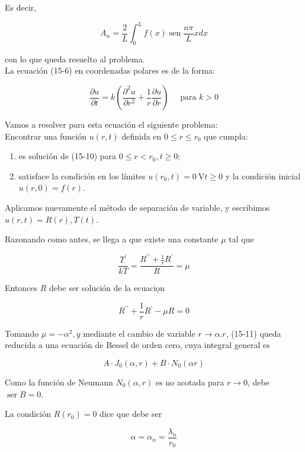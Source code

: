 \documentclass[10pt]{article}
\theoremstyle{plain}
\theoremstyle{definition}
\theoremstyle{remark}
\begin{document}
Es decir,

$$
A_{n}=\frac{2}{L} \int_{0}^{L} f(x) \operatorname{sen} \frac{n \pi}{L} x d x
$$

con lo que queda resuelto al problema.\\
La ecuación (15-6) en coordenadas polares es de la forma:


\begin{equation*}
\frac{\partial u}{\partial t}=k\left(\frac{\partial^{2} u}{\partial r^{2}}+\frac{1}{r} \frac{\partial u}{\partial r}\right) \quad \text { para } k>0 \tag{15-10}
\end{equation*}


Vamos a resolver para esta ecuación el siguiente problema:\\
Encontrar una función $u(r, t)$ definida en $0 \leqslant r \leqslant r_{0}$ que cumpla:

\begin{enumerate}
  \item es solución de (15-10) para $0 \leqslant r<r_{0}, t \geqslant 0$;
  \item satisface la condición en los límites $u\left(r_{0}, t\right)=0 \mathrm{~V} t \geqslant 0$ y la condición inicial $u(r, 0)=f(r)$.
\end{enumerate}

Aplicamos nuevamente el método de separación de variable, y escribimos $u(r, t)=R(r), T(t)$.

Razonando como antes, se llega a que existe una constante $\mu$ tal que

$$
\frac{T^{\prime}}{k T}=\frac{R^{\prime \prime}+\frac{1}{r} R^{\prime}}{R}=\mu
$$

Entonces $R$ debe ser solución de la ecuaciọn


\begin{equation*}
R^{\prime \prime}+\frac{1}{r} R^{\prime}-\mu R=0 \tag{$15\cdot11$}
\end{equation*}


Tomando $\mu=-\alpha^{2}, y$ mediante el cambio de variable $r \rightarrow \alpha . r$, (15-11) queda reducida a una ecuación de Bessel de orden cero, cuya integral general es

$$
A \cdot J_{0}(\alpha, r)+B \cdot N_{0}(\alpha r)
$$

Como la función de Neumann $N_{0}(\alpha, r)$ es no acotada para $r \rightarrow 0$, debe $\operatorname{ser} B=0$.

La condición $R\left(r_{0}\right)=0$ dice que debe ser

$$
\alpha=\alpha_{n}=\frac{\lambda_{n}}{r_{0}}
$$
\end{document}
